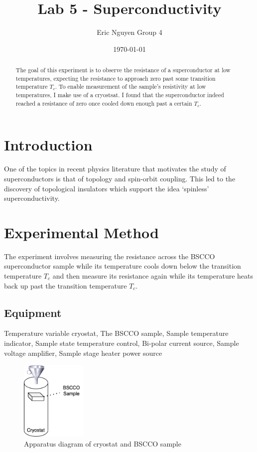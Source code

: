\documentclass[12pt]{article}
\author{Eric Nguyen \qquad Group 4}
\date{\today}
\title{Lab 5 - Superconductivity}
\begin{document}
\maketitle
\begin{abstract}
The goal of this experiment is to observe the resistance of a superconductor at low temperatures, expecting the resistance to approach zero past some transition temperature \(T_c\).
To enable measurement of the sample's resistivity at low temperatures, I make use of a cryostsat.
I found that the superconductor indeed reached a resistance of zero once cooled down enough past a certain \(T_c\).
\end{abstract}

\section*{Introduction}
\label{sec:orgd8fe36a}

One of the topics in recent physics literature that motivates the study of superconductors is that of topology and spin-orbit coupling.
This led to the discovery of topological insulators which support the idea `spinless' superconductivity. \cite{Sato_2017}

\section*{Experimental Method}
\label{sec:org923a4e0}

The experiment involves measuring the resistance across the BSCCO superconductor sample while its temperature cools down below the transition temperature \(T_c\) and then measure its resistance again while its temperature heats back up past the transition temperature \(T_c\).

\subsection*{Equipment}
\label{sec:org9b9e895}

Temperature variable cryostat, The BSCCO sample, Sample temperature indicator, Sample state temperature control, Bi-polar current source, Sample voltage amplifier, Sample stage heater power source

\begin{figure}[htbp]
\centering
\includegraphics[width=120px]{./lab5.png}
\caption{Apparatus diagram of cryostat and BSCCO sample}
\end{figure}
\end{document}
